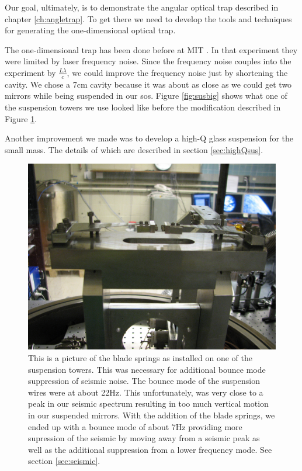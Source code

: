 
Our goal, ultimately, is to demonstrate the angular optical trap described in
chapter \ref{ch:angletrap}.
To get there we need to develop the tools and techniques for generating the
one-dimensional optical trap.

The one-dimensional trap has been done before at MIT \cite{Corbitt07}.
In that experiment they were limited by laser frequency noise.
Since the frequency noise couples into the experiment by $\frac{L \lambda}{c}$,
we could improve the frequency noise just by shortening the cavity. We chose
a 7cm cavity because it was about as close as we could get two mirrors while
being suspended in our \ac{sos}. Figure \ref{fig:susbig} shows what one of the
suspension towers we use looked like before the modification described in
Figure \ref{fig:blades}.

Another improvement we made was to develop a high-Q glass suspension for the
small mass. The details of which are described in section \ref{sec:highQsus}.

\begin{figure}[h]
\centering
  \includegraphics[width=15cm]{./figures/bladesprings.jpg}
  \caption[Blade Spring Modification for Veritcal Isolation]{
  This is a picture of the blade springs as installed on one of the suspension
  towers.
  This was necessary for additional bounce mode suppression of seismic noise.
  The bounce mode of the suspension wires were at about 22Hz.
  This unfortunately, was very close to a peak in our seismic spectrum
  resulting in too much vertical motion in our suspended mirrors.
  With the addition of the blade springs, we ended up with a bounce mode of
  about 7Hz providing more supression of the seismic by moving away from a
  seismic peak as well as the additional suppression from a lower frequency
  mode. See section \ref{sec:seismic}.
  }
  \label{fig:blades}
\end{figure}

